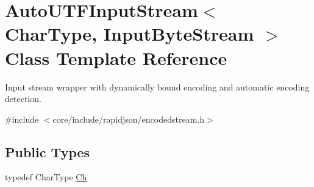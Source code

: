 \hypertarget{classAutoUTFInputStream}{}\section{Auto\+U\+T\+F\+Input\+Stream$<$ Char\+Type, Input\+Byte\+Stream $>$ Class Template Reference}
\label{classAutoUTFInputStream}


Input stream wrapper with dynamically bound encoding and automatic encoding detection.  




{\ttfamily \#include $<$core/include/rapidjson/encodedstream.\+h$>$}

\subsection*{Public Types}
\begin{DoxyCompactItemize}
\item 
typedef Char\+Type \hyperlink{classAutoUTFInputStream_a3bb3eb46f2c20404a7ac21963cfe348f}{Ch}
\end{DoxyCompactItemize}
